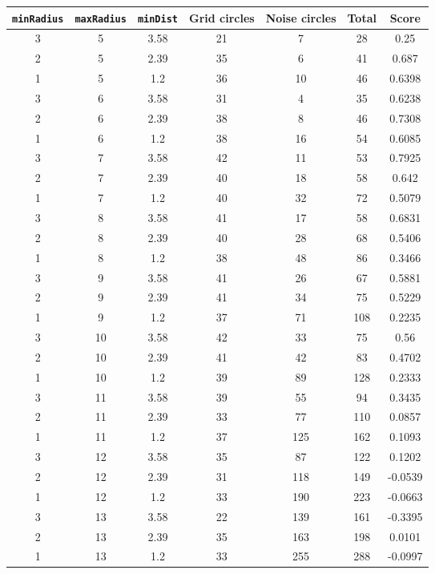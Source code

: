 \documentclass[letterpaper, 12pt]{article}
\begin{document}
\begin{longtable}{|c|c|c|c|c|c|c|}
\hline
\textbf{\texttt{minRadius}} & \textbf{\texttt{maxRadius}} & \textbf{\texttt{minDist}} & \textbf{Grid circles} & \textbf{Noise circles} & \textbf{Total} & \textbf{Score} \\
\hline
3 & 5 & 3.58 & 21 & 7 & 28 & 0.25 \\
\hline
2 & 5 & 2.39 & 35 & 6 & 41 & 0.687 \\
\hline
1 & 5 & 1.2 & 36 & 10 & 46 & 0.6398 \\
\hline
3 & 6 & 3.58 & 31 & 4 & 35 & 0.6238 \\
\hline
2 & 6 & 2.39 & 38 & 8 & 46 & 0.7308 \\
\hline
1 & 6 & 1.2 & 38 & 16 & 54 & 0.6085 \\
\hline
3 & 7 & 3.58 & 42 & 11 & 53 & 0.7925 \\
\hline
2 & 7 & 2.39 & 40 & 18 & 58 & 0.642 \\
\hline
1 & 7 & 1.2 & 40 & 32 & 72 & 0.5079 \\
\hline
3 & 8 & 3.58 & 41 & 17 & 58 & 0.6831 \\
\hline
2 & 8 & 2.39 & 40 & 28 & 68 & 0.5406 \\
\hline
1 & 8 & 1.2 & 38 & 48 & 86 & 0.3466 \\
\hline
3 & 9 & 3.58 & 41 & 26 & 67 & 0.5881 \\
\hline
2 & 9 & 2.39 & 41 & 34 & 75 & 0.5229 \\
\hline
1 & 9 & 1.2 & 37 & 71 & 108 & 0.2235 \\
\hline
3 & 10 & 3.58 & 42 & 33 & 75 & 0.56 \\
\hline
2 & 10 & 2.39 & 41 & 42 & 83 & 0.4702 \\
\hline
1 & 10 & 1.2 & 39 & 89 & 128 & 0.2333 \\
\hline
3 & 11 & 3.58 & 39 & 55 & 94 & 0.3435 \\
\hline
2 & 11 & 2.39 & 33 & 77 & 110 & 0.0857 \\
\hline
1 & 11 & 1.2 & 37 & 125 & 162 & 0.1093 \\
\hline
3 & 12 & 3.58 & 35 & 87 & 122 & 0.1202 \\
\hline
2 & 12 & 2.39 & 31 & 118 & 149 & -0.0539 \\
\hline
1 & 12 & 1.2 & 33 & 190 & 223 & -0.0663 \\
\hline
3 & 13 & 3.58 & 22 & 139 & 161 & -0.3395 \\
\hline
2 & 13 & 2.39 & 35 & 163 & 198 & 0.0101 \\
\hline
1 & 13 & 1.2 & 33 & 255 & 288 & -0.0997 \\

\end{longtable}
\end{document}
